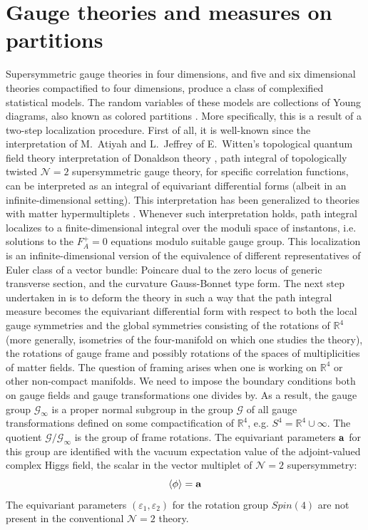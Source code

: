 \documentclass[12pt]{article}
\numberwithin{equation}{section}
\newcommand{\ve}{{\varepsilon}}
\newcommand\beq{\begin{equation}}
\newcommand\eeq{\end{equation}}
\theoremstyle{definition}
\newcommand {\BR}   {\mathbb R}
\newcommand {\CalG} {\mathcal G}
\newcommand {\CalN} {\mathcal N}
\begin{document}
\section{Gauge theories and measures on partitions}\label{gauge-part}
Supersymmetric gauge theories in four dimensions, and five and six dimensional theories compactified to four dimensions, produce a class of complexified statistical models. The random variables of these models are collections of Young diagrams, also known as colored partitions \cite{Nekrasov:2002qd, Nekrasov2015BPSCFTCN}. 
More specifically, this is a result of a two-step localization procedure. First of all, it is well-known since the interpretation of M.~Atiyah and L.~Jeffrey of E.~Witten's topological quantum field theory interpretation \cite{Witten:1988ze} of Donaldson theory \cite{Donaldson:1990kn}, path integral of topologically twisted ${\CalN}=2$ supersymmetric gauge theory, for specific correlation functions, can be interpreted as an integral of equivariant differential forms (albeit in an infinite-dimensional setting). 
This interpretation has been generalized to theories with matter hypermultiplets  \cite{Vafa:1994tf,Labastida:1996tz,Moore:1997pc,Losev:1997tp}. Whenever such interpretation holds, path integral localizes to a finite-dimensional integral over the moduli space of instantons, i.e. solutions to the $F^{+}_{A}=0$ equations modulo suitable gauge group.  This localization is an infinite-dimensional version of the equivalence of different representatives of Euler class of a vector bundle: Poincare dual to the zero locus of generic transverse section,
and the curvature Gauss-Bonnet type form. The next step undertaken in \cite{Nekrasov:2002qd} is to deform the theory in such a way that the path integral measure becomes the equivariant differential form with respect to both the local gauge symmetries and the global symmetries consisting of the rotations of ${\BR}^{4}$ (more generally, isometries of the four-manifold on which one studies the theory), the rotations of gauge frame and possibly rotations of the spaces of multiplicities of matter fields. The question of framing arises when one is working on ${\BR}^{4}$ or other non-compact manifolds. We need to impose the boundary conditions both on gauge fields and gauge transformations one divides by. As a result, the gauge group ${\CalG}_{\infty}$ is a proper normal subgroup in the group ${\CalG}$ of all gauge transformations defined on some compactification of ${\BR}^{4}$, e.g. $S^{4} = {\BR}^{4} \cup {\infty}$. The quotient ${\CalG}/{\CalG}_{\infty}$ is the group of frame rotations. The equivariant parameters $\bf a$ for this group are identified with the vacuum expectation value of the adjoint-valued complex Higgs field, the scalar in the vector multiplet of ${\CalN}=2$ supersymmetry:
\beq
\langle {\phi} \rangle = {\bf a} 
\eeq
The equivariant parameters $({\ve}_{1}, {\ve}_{2})$ for the rotation group $Spin(4)$ are not present in the conventional ${\CalN}=2$ theory. 
\end{document}
